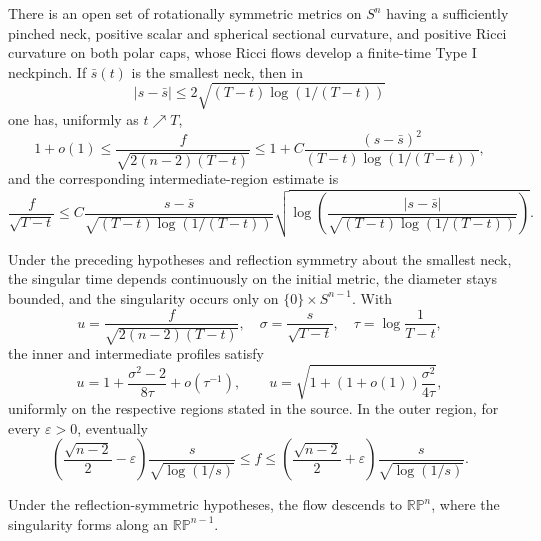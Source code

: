 \begin{theorem}
\label{thm:chow-ii-appd-neckpinch-existence}


There is an open set of rotationally symmetric metrics on $S^n$ having a
sufficiently pinched neck, positive scalar and spherical sectional curvature,
and positive Ricci curvature on both polar caps, whose Ricci flows develop a
finite-time Type I neckpinch. If $\bar s(t)$ is the smallest neck, then in
\[
 |s-\bar s|\leq2\sqrt{(T-t)\log(1/(T-t))}
\]
one has, uniformly as $t\nearrow T$,
\[
 1+o(1)\leq\frac{f}{\sqrt{2(n-2)(T-t)}}
 \leq1+C\frac{(s-\bar s)^2}{(T-t)\log(1/(T-t))},
\]
and the corresponding intermediate-region estimate is
\[
 \frac f{\sqrt{T-t}}\leq
 C\frac{s-\bar s}{\sqrt{(T-t)\log(1/(T-t))}}
 \sqrt{\log\left(\frac{|s-\bar s|}
 {\sqrt{(T-t)\log(1/(T-t))}}\right)}.
\]
\end{theorem}

\begin{theorem}
\label{thm:chow-ii-appd-neckpinch-asymptotics}


Under the preceding hypotheses and reflection symmetry about the smallest
neck, the singular time depends continuously on the initial metric, the
diameter stays bounded, and the singularity occurs only on
$\{0\}\times S^{n-1}$. With
\[
 u=\frac f{\sqrt{2(n-2)(T-t)}},\quad
 \sigma=\frac s{\sqrt{T-t}},\quad \tau=\log\frac1{T-t},
\]
the inner and intermediate profiles satisfy
\[
 u=1+\frac{\sigma^2-2}{8\tau}+o(\tau^{-1}),\qquad
 u=\sqrt{1+(1+o(1))\frac{\sigma^2}{4\tau}},
\]
uniformly on the respective regions stated in the source. In the outer
region, for every $\varepsilon>0$, eventually
\[
 \left(\frac{\sqrt{n-2}}2-\varepsilon\right)
 \frac{s}{\sqrt{\log(1/s)}}\leq f\leq
 \left(\frac{\sqrt{n-2}}2+\varepsilon\right)
 \frac{s}{\sqrt{\log(1/s)}}.
\]
\end{theorem}

\begin{remark}
\label{rem:chow-ii-appd-projective-neckpinch}


Under the reflection-symmetric hypotheses, the flow descends to
$\mathbb{RP}^n$, where the singularity forms along an
$\mathbb{RP}^{n-1}$.
\end{remark}

